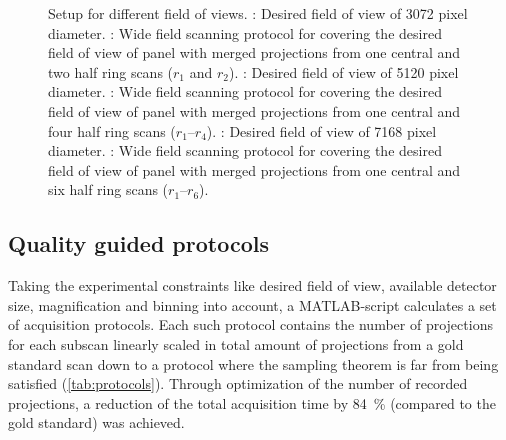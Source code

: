 \begin{figure}[p]
	\caption[Setup for different field of views]{Setup for different field of views. %
		: Desired field of view of 3072 pixel diameter. %
		: Wide field scanning protocol for covering the desired field of view of panel  with merged projections from one central and two half ring scans ($r_{1}$ and $r_{2}$). %
		: Desired field of view of 5120 pixel diameter. %
		: Wide field scanning protocol for covering the desired field of view of panel  with merged projections from one central and four half ring scans ($r_{1}$--$r_{4}$). %
		: Desired field of view of 7168 pixel diameter. %
		: Wide field scanning protocol for covering the desired field of view of panel  with merged projections from one central and six half ring scans ($r_{1}$--$r_{6}$).}%
	\label{fig:SubScan-Setup}
\end{figure}%

\subsection{Quality guided protocols}\label{sec:quality guided protocols}
Taking the experimental constraints like desired field of view, available detector size, magnification and binning into account, a MATLAB-script calculates a set of acquisition protocols. Each such protocol contains the number of projections for each subscan linearly scaled in total amount of projections from a gold standard scan down to a protocol where the sampling theorem is far from being satisfied (\autoref{tab:protocols}). Through optimization of the number of recorded projections, a reduction of the total acquisition time by \SI{84}{\percent} (compared to the gold standard) was achieved.

